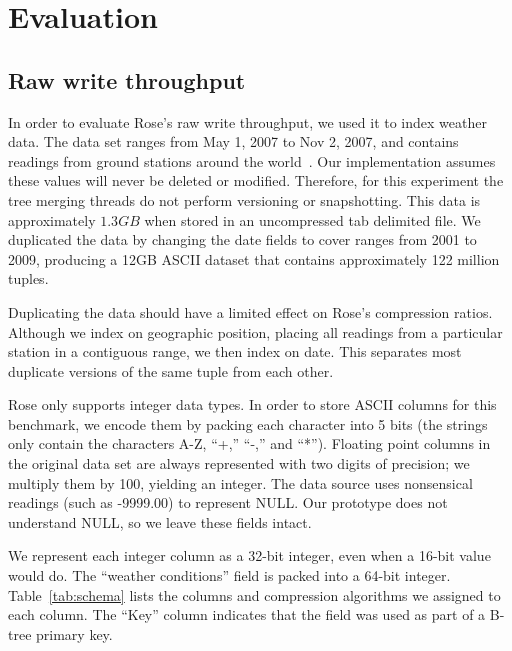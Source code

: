 \documentclass{vldb}
\newcommand{\rows}{Rose\xspace}
\newcommand{\rowss}{Rose's\xspace}
\begin{document}
\section{Evaluation}

\subsection{Raw write throughput}

In order to evaluate \rowss raw write throughput, we used it to index
weather data.  The data set ranges from May 1,
2007 to Nov 2, 2007, and contains readings from ground stations around
the world~\cite{nssl}.  Our implementation assumes these values will never be deleted or modified.  Therefore, for this experiment the tree merging threads do not perform versioning or snapshotting.  This data is approximately $1.3GB$ when stored in an
uncompressed tab delimited file.  We duplicated the data by changing
the date fields to cover ranges from 2001 to 2009, producing a 12GB
ASCII dataset that contains approximately 122 million tuples.

Duplicating the data should have a limited effect on \rowss
compression ratios.  Although we index on geographic position, placing
all readings from a particular station in a contiguous range, we then
index on date.  This separates most duplicate versions of the same tuple
from each other.

\rows only supports integer data types.  In order to store ASCII columns for this benchmark, we encode them
by packing each character into 5 bits (the strings only
contain the characters A-Z, ``+,'' ``-,'' and ``*'').  Floating point columns in
the original data set are always represented with two digits of precision;
we multiply them by 100, yielding an integer.  The data source uses
nonsensical readings (such as -9999.00) to represent NULL.  Our
prototype does not understand NULL, so we leave these fields intact.

We represent each integer column as a 32-bit integer, even when a 16-bit value
would do.  The ``weather conditions'' field is packed into a
64-bit integer.  Table~\ref{tab:schema} lists the columns and
compression algorithms we assigned to each column.  The ``Key'' column indicates
that the field was used as part of a B-tree primary key.
\end{document}
